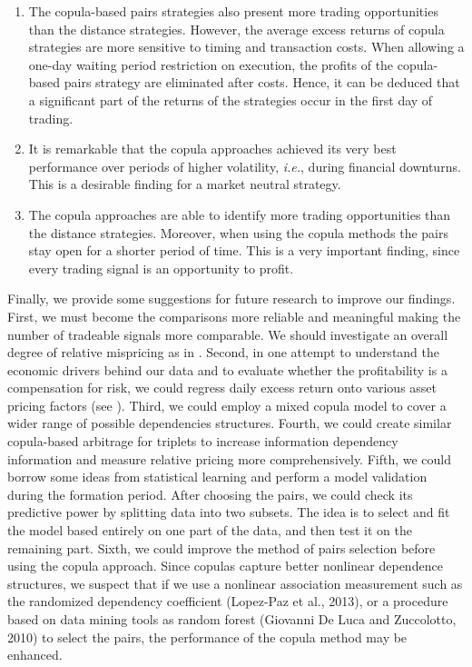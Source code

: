 \documentclass[a4paper,12pt]{report}
\begin{document}
\begin{enumerate}
	\item The copula-based pairs strategies also present more trading opportunities than the distance strategies. However, the average excess returns of copula strategies are more sensitive to timing and transaction costs. When allowing a one-day waiting period restriction on execution, the profits of the copula-based pairs strategy are eliminated after costs. Hence, it can be deduced that a 
	significant part of the returns of the strategies occur in the first day of trading.
	\item It is remarkable that the copula approaches achieved its very best performance over periods of higher volatility, \emph{i.e.}, during financial downturns. This is a desirable finding for a market neutral strategy.
	\item The copula approaches are able to identify more trading opportunities than the distance strategies. Moreover, when using the copula methods the pairs stay open for a shorter period of time. This is a very important finding, since every trading signal is an opportunity to profit.
	
\end{enumerate}

Finally, we provide some suggestions for future research to improve our findings. First, we must become the comparisons more reliable and meaningful making the number of tradeable signals more comparable. We should investigate an overall degree of relative mispricing as in \citet*{rf15}. Second, in one attempt to understand the economic drivers behind our data and to evaluate whether the profitability is a compensation for risk, we could regress daily excess return onto various asset pricing factors (see \citet*{fama2012}). Third, we could employ a mixed copula model to cover a wider range of possible dependencies structures. Fourth, we could create similar copula-based arbitrage for triplets to increase information dependency information and measure relative pricing more comprehensively. Fifth, we could borrow some ideas from statistical learning and perform a model validation during the formation period. After choosing the pairs, we could check its predictive power by splitting data into two subsets. The idea is to select and fit the model based entirely on one part of the data, and then test it on the remaining part. Sixth, we could improve the method of pairs selection before using the copula approach. Since copulas capture better nonlinear dependence structures, we suspect that if we use a nonlinear association measurement such as the randomized dependency coefficient (Lopez-Paz et al., 2013), or a procedure based on data mining tools as random forest (Giovanni De Luca and Zuccolotto, 2010) to select the pairs, the performance of the copula method may be enhanced.
\end{document}
